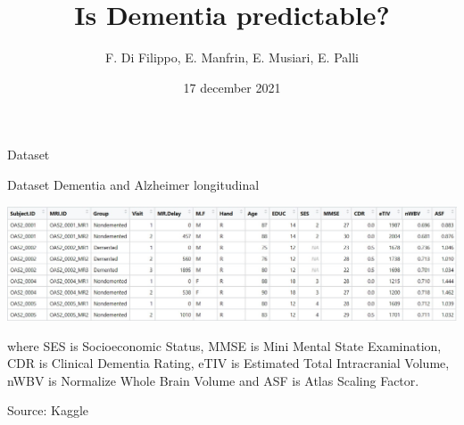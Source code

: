 \documentclass{beamer}
\title{Is Dementia predictable?}
\author{F. Di Filippo, E. Manfrin, E. Musiari, E. Palli}
\date{17 december 2021}
\begin{document}
\begin{frame}
\maketitle
\end{frame}


\begin{frame}{Dataset}

Dataset Dementia and Alzheimer longitudinal
\begin{center}%
	
	
	\includegraphics[width=\columnwidth]{dataset_al.jpeg}
\end{center}


where SES is Socioeconomic Status, MMSE is Mini Mental State Examination, CDR is Clinical Dementia Rating, eTIV is Estimated Total Intracranial Volume, nWBV is Normalize Whole Brain Volume and ASF is Atlas Scaling Factor.

\vspace{0.1 cm}
Source: Kaggle


\end{frame}

\begin{frame}
	
\end{frame}
\end{document}
